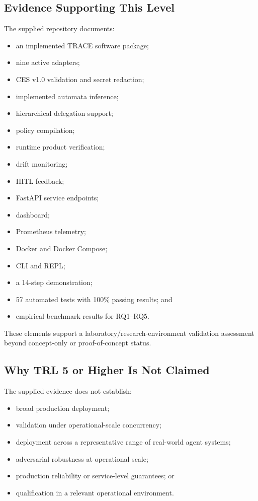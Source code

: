 \documentclass[11pt,a4paper]{article}
\begin{document}
\subsection*{Evidence Supporting This Level}

The supplied repository documents:

\begin{itemize}
\item an implemented TRACE software package;
\item nine active adapters;
\item CES v1.0 validation and secret redaction;
\item implemented automata inference;
\item hierarchical delegation support;
\item policy compilation;
\item runtime product verification;
\item drift monitoring;
\item HITL feedback;
\item FastAPI service endpoints;
\item dashboard;
\item Prometheus telemetry;
\item Docker and Docker Compose;
\item CLI and REPL;
\item a 14-step demonstration;
\item 57 automated tests with 100\% passing results; and
\item empirical benchmark results for RQ1--RQ5.
\end{itemize}

These elements support a laboratory/research-environment validation assessment beyond
concept-only or proof-of-concept status.

\subsection*{Why TRL 5 or Higher Is Not Claimed}

The supplied evidence does not establish:

\begin{itemize}
\item broad production deployment;
\item validation under operational-scale concurrency;
\item deployment across a representative range of real-world agent systems;
\item adversarial robustness at operational scale;
\item production reliability or service-level guarantees; or
\item qualification in a relevant operational environment.
\end{itemize}
\end{document}
